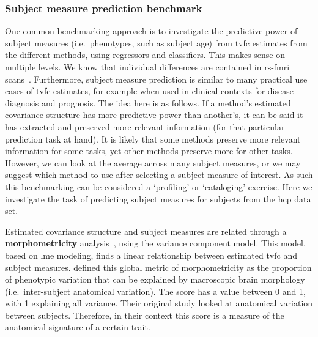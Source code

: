 \subsubsection{Subject measure prediction benchmark}

One common benchmarking approach is to investigate the predictive power of subject measures (i.e.~phenotypes, such as subject age) from \gls{tvfc} estimates from the different methods, using regressors and classifiers.
This makes sense on multiple levels.
We know that individual differences are contained in \gls{rs-fmri} scans~\parencite{Finn2015}.
Furthermore, subject measure prediction is similar to many practical use cases of \gls{tvfc} estimates, for example when used in clinical contexts for disease diagnosis and prognosis.
%
The idea here is as follows.
If a method's estimated covariance structure has more predictive power than another's, it can be said it has extracted and preserved more relevant information (for that particular prediction task at hand).
It is likely that some methods preserve more relevant information for some tasks, yet other methods preserve more for other tasks.
However, we can look at the average across many subject measures, or we may suggest which method to use after selecting a subject measure of interest.
As such this benchmarking can be considered a `profiling' or `cataloging' exercise.
Here we investigate the task of predicting subject measures for subjects from the \gls{hcp} data set.

Estimated covariance structure and subject measures are related through a \textbf{morphometricity} analysis~\parencite{Sabuncu2016}, using the variance component model.
This model, based on \gls{lme} modeling, finds a linear relationship between estimated \gls{tvfc} and subject measures.
\textcite{Sabuncu2016} defined this global metric of morphometricity as the proportion of phenotypic variation that can be explained by macroscopic brain morphology (i.e.~inter-subject anatomical variation).
The score has a value between 0 and 1, with 1 explaining all variance.
Their original study looked at anatomical variation between subjects.
Therefore, in their context this score is a measure of the anatomical signature of a certain trait.

